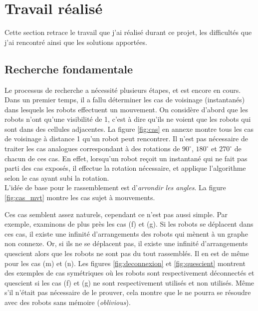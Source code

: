 \section{Travail réalisé}

Cette section retrace le travail que j'ai réalisé durant ce projet, les
difficultés que j'ai rencontré ainsi que les solutions apportées.

\subsection{Recherche fondamentale}

Le processus de recherche a nécessité plusieurs étapes, et est encore en cours.
Dans un premier temps, il a fallu déterminer les cas de voisinage (instantanés)
dans lesquels les robots effectuent un mouvement. On considère d'abord que les
robots n'ont qu'une visibilité de 1, c'est à dire qu'ils ne voient que les
robots qui sont dans des cellules adjacentes. La figure \ref{fig:cas} en annexe
montre tous les cas de voisinage à distance 1 qu'un robot peut rencontrer. Il
n'est pas nécessaire de traiter les cas analogues correspondant à des rotations
de $90^\circ{}$, $180^\circ{}$ et $270^\circ{}$ de chacun de ces cas.  En
effet, lorsqu'un robot reçoit un instantané qui ne fait pas parti des cas
exposés, il effectue la rotation nécessaire, et applique l'algorithme selon le
cas ayant subi la rotation. \\

L'idée de base pour le rassemblement est d'\textit{arrondir les angles}. La
figure \ref{fig:cas_mvt} montre les cas sujet à mouvements.



Ces cas semblent assez naturels, cependant ce n'est pas aussi simple. Par
exemple, examinons de plus près les cas (f) et (g). Si les robots se déplacent
dans ces cas, il existe une infinité d'arrangements des robots qui mènent à un
graphe non connexe. Or, si ils ne se déplacent pas, il existe une infinité
d'arrangements quescient alors que les robots ne sont pas du tout rassemblés.
Il en est de même pour les cas (m) et (n). Les figures \ref{fig:deconnexion} et
\ref{fig:quescient} montrent des exemples de cas symétriques où les robots sont
respectivement déconnectés et quescient si les cas (f) et (g) ne sont
respectivement utilisés et non utilisés. Même s'il n'était pas nécessaire de le
prouver, cela montre que le \GatheringProblem ne pourra se résoudre avec des
robots sans mémoire (\textit{oblivious}).

